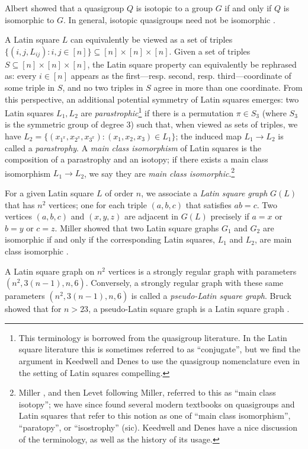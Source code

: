 \documentclass{theoretics}
\begin{document}
Albert showed that a quasigroup $Q$ is isotopic to a group $G$ if and only if $Q$ is isomorphic to $G$. In general, isotopic quasigroups need not be isomorphic \cite{Albert}.

A Latin square $L$ can equivalently be viewed as a set of triples $\{(i,j,L_{ij}) : i,j \in [n]\} \subseteq [n] \times [n] \times [n]$. Given a set of triples $S \subseteq [n] \times [n] \times [n]$, the Latin square property can equivalently be rephrased as: every $i \in [n]$ appears as the first---resp. second, resp. third---coordinate of some triple in $S$, and no two triples in $S$ agree in more than one coordinate. From this perspective, an additional potential symmetry of Latin squares emerges: two Latin squares $L_1, L_2$ are \emph{parastrophic}\footnote{This terminology is borrowed from the quasigroup literature. In the Latin square literature this is sometimes referred to as ``conjugate'', but we find the argument in Keedwell and Denes \cite[pp. 15--16]{KeedwellDenes} to use  the quasigroup nomenclature even in the setting of Latin squares compelling.} if there is a permutation $\pi \in S_3$ (where $S_3$ is the symmetric group of degree $3$) such that, when viewed as sets of triples, we have $L_2 = \{(x_{1^\pi}, x_{2^\pi}, x_{3^\pi}) : (x_1, x_2, x_3) \in L_1\}$; the induced map $L_1 \to L_2$ is called a \emph{parastrophy}. A \emph{main class isomorphism} of Latin squares is the composition of a parastrophy and an isotopy; if there exists a main class isomorphism $L_1 \to L_2$, we say they are \emph{main class isomorphic}.\footnote{Miller \cite{MillerTarjan}, and then Levet \cite{LevetLatinSquares} following Miller, referred to this as ``main class isotopy''; we have since found several modern textbooks on quasigroups and Latin squares that refer to this notion as one of ``main class isomorphism'', ``paratopy'', or ``isostrophy'' (sic). Keedwell and Denes \cite[pp. 15--16]{KeedwellDenes} have a nice discussion of the  terminology, as well as the history of its usage.}

For a given Latin square $L$ of order $n$, we associate a \textit{Latin square graph} $G(L)$ that has $n^{2}$ vertices; one for each triple $(a, b, c)$ that satisfies $ab = c$. Two vertices $(a, b, c)$ and $(x, y, z)$ are adjacent in $G(L)$ precisely if $a = x$ or $b = y$ or $c = z$. Miller showed that two Latin square graphs $G_{1}$ and $G_{2}$ are isomorphic if and only if the corresponding Latin squares, $L_{1}$ and $L_{2}$, are main class isomorphic \cite{MillerTarjan}. 

A Latin square graph on $n^{2}$ vertices is a strongly regular graph with parameters $(n^{2}, 3(n-1), n, 6)$. Conversely, a strongly regular graph with these same parameters $(n^{2}, 3(n-1), n, 6)$ is called a \textit{pseudo-Latin square graph}. Bruck showed that for $n > 23$, a pseudo-Latin square graph is a Latin square graph \cite{Bruck}.
\end{document}
